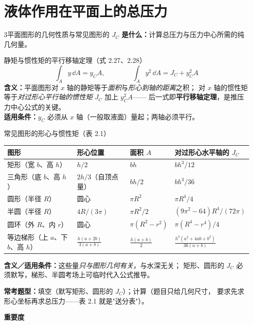 \section{液体作用在平面上的总压力}

\begin{kaodian}{3}{平面图形的几何性质与常见图形的 $J_C$}
\textbf{是什么：}计算总压力与压力中心所需的纯几何量。

\begin{gongshi}{静矩与惯性矩的平行移轴定理（式 2.27、2.28）}
\[ \int_A y\,\dd A=y_C A,\qquad\qquad \int_A y^2\,\dd A=J_C+y_C^2A \]
\textbf{含义：}平面图形对 $x$ 轴的静矩等于\emph{面积}与\emph{形心到轴的距离}之积；
对 $x$ 轴的惯性矩等于\emph{对过形心平行轴的惯性矩} $J_C$ 加上 $y_C^2A$——
后一式即\textbf{平行移轴定理}，是推压力中心公式的关键。\\
\textbf{适用条件：}$y_C$ 必须从 $x$ 轴（一般取液面）量起；两轴必须平行。
\end{gongshi}

\begin{gongshi}{常见图形的形心与惯性矩（表 2.1）}
\begin{center}
\begin{tabularx}{\textwidth}{@{}lXXX@{}}
\toprule
图形 & 形心位置 & 面积 $A$ & 对过形心水平轴的 $J_C$ \\
\midrule
矩形（宽 $b$、高 $h$） & $h/2$ & $bh$ & $bh^3/12$ \\
三角形（底 $b$、高 $h$） & $2h/3$（自顶点量） & $bh/2$ & $bh^3/36$ \\
圆形（半径 $R$） & 圆心 & $\pi R^2$ & $\pi R^4/4$ \\
半圆（半径 $R$） & $4R/(3\pi)$ & $\pi R^2/2$ & $(9\pi^2-64)R^4/(72\pi)$ \\
圆环（外 $R$、内 $r$） & 圆心 & $\pi(R^2-r^2)$ & $\pi(R^4-r^4)/4$ \\
等边梯形（上 $a$、下 $b$、高 $h$） & $\frac{h(a+2b)}{3(a+b)}$ & $\frac{h(a+b)}{2}$ & $\frac{h^3(a^2+4ab+b^2)}{36(a+b)}$ \\
\bottomrule
\end{tabularx}
\end{center}
\textbf{含义／适用条件：}这些量\emph{只与图形几何有关}，与水深无关；
矩形、圆形的 $J_C$ 必须默写，梯形、半圆考场上可临时代入公式推导。
\end{gongshi}

\textbf{常考题型：}填空（默写矩形、圆形的 $J_C$）；计算（题目只给几何尺寸，
要求先求形心坐标再求总压力——表 2.1 就是"送分表"）。

\textbf{重要度 }\quad{}\quad{}
\end{kaodian}

